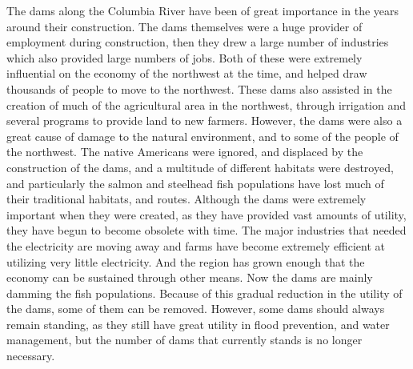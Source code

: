 \documentclass[12pt,twoside]{article}
\begin{document}
The dams along the Columbia River have been of great importance in the years
around their construction. The dams themselves were a huge provider of
employment during construction, then they drew a large number of industries
which also provided large numbers of jobs. Both of these were extremely
influential on the economy of the northwest at the time, and helped draw
thousands of people to move to the northwest. These dams also assisted in the
creation of much of the agricultural area in the northwest, through irrigation
and several programs to provide land to new farmers. However, the dams were
also a great cause of damage to the natural environment, and to some of the
people of the northwest. The native Americans were ignored, and displaced by
the construction of the dams, and a multitude of different habitats were
destroyed, and particularly the salmon and steelhead fish populations have lost
much of their traditional habitats, and routes. Although the dams were
extremely important when they were created, as they have provided vast amounts
of utility, they have begun to become obsolete with time. The major industries
that needed the electricity are moving away and farms have become extremely
efficient at utilizing very little electricity. And the region has grown enough
that the economy can be sustained through other means. Now the dams are mainly
damming the fish populations. Because of this gradual reduction in the utility
of the dams, some of them can be removed. However, some dams should always
remain standing, as they still have great utility in flood prevention, and
water management, but the number of dams that currently stands is no longer
necessary.

\newpage
\printbibliography{}
\end{document}
